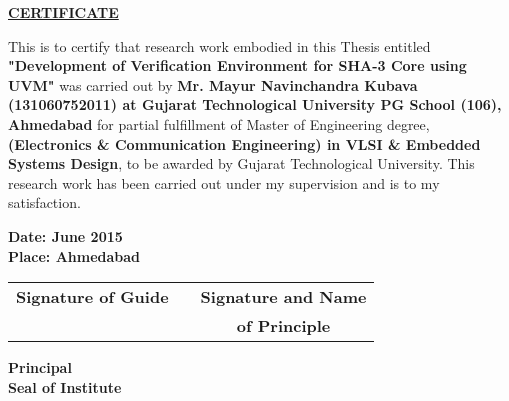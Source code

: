 \thispagestyle{plain}

\begin{center}
	\midsize\textbf{\underline {CERTIFICATE}}
\end{center}
    
This is to certify that research work embodied in this Thesis entitled \textbf{"Development of Verification Environment for SHA-3 Core using UVM"} was carried out by \textbf{Mr. Mayur Navinchandra Kubava (131060752011) at Gujarat Technological University PG School (106), Ahmedabad} for partial fulfillment of Master of Engineering degree, \textbf{(Electronics \& Communication Engineering) in VLSI \& Embedded Systems Design}, to be awarded by Gujarat Technological University. This research work has been carried out under my supervision and is to my satisfaction.
    
    \vspace {1cm}
    
    \textbf{Date: June 2015} \\
    \textbf{Place: Ahmedabad}
    
    \vspace{2cm}

    \begin{tabular}{c m{4cm} c}
    	\textbf{Signature of Guide} & & \textbf{Signature and Name} \\
    	& & \textbf{of Principle} \\
    \end{tabular}
    
    \vspace{2.5cm}
    
    \begin{center}
    
	    	\textbf{Principal}\\
	    	\vspace{2.5cm}
	    	\textbf{Seal of Institute} 
	\end{center}
	
